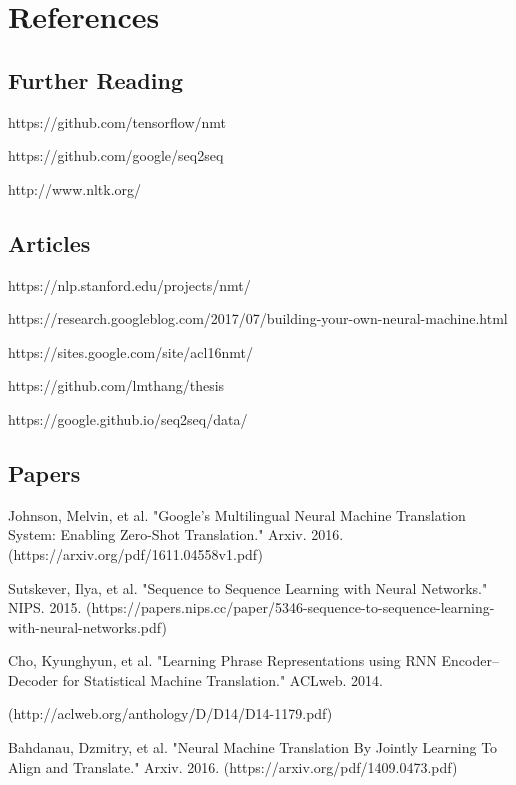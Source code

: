 \documentclass[10pt,a4paper]{article}
\begin{document}
\section{References}

\subsection{Further Reading}

https://github.com/tensorflow/nmt

https://github.com/google/seq2seq

http://www.nltk.org/

\subsection{Articles}

https://nlp.stanford.edu/projects/nmt/

https://research.googleblog.com/2017/07/building-your-own-neural-machine.html

https://sites.google.com/site/acl16nmt/

https://github.com/lmthang/thesis

https://google.github.io/seq2seq/data/

\subsection{Papers}

Johnson, Melvin, et al. "Google’s Multilingual Neural Machine Translation System: Enabling Zero-Shot Translation." Arxiv. 2016.
(https://arxiv.org/pdf/1611.04558v1.pdf)
\newline

Sutskever, Ilya, et al. "Sequence to Sequence Learning with Neural Networks." NIPS. 2015.
(https://papers.nips.cc/paper/5346-sequence-to-sequence-learning-with-neural-networks.pdf)
\newline

Cho, Kyunghyun, et al. "Learning Phrase Representations using RNN Encoder–Decoder for Statistical Machine Translation." ACLweb. 2014.

(http://aclweb.org/anthology/D/D14/D14-1179.pdf)
\newline

Bahdanau, Dzmitry, et al. "Neural Machine Translation By Jointly Learning To Align and Translate." Arxiv. 2016.
(https://arxiv.org/pdf/1409.0473.pdf)
\newline
\end{document}
